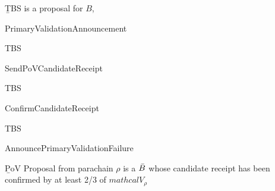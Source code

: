 \begin{definition}
  \label{defn-candidate-receipt}
        {\b TBS} is a proposal for $B$,
\end{definition}

\begin{algorithm}
  \caption[PrimaryValidationAnnouncement]{\sc PrimaryValidationAnnouncement}
  \label{algo-primary-validation-announcement}
  \begin{algorithmic}[1]
    \Require{}
    
    \State TBS
  \end{algorithmic}
\end{algorithm}

\begin{algorithm}
  \caption[]{\sc SendPoVCandidateReceipt}
  \label{algo-send-candidate-receipt}
  \begin{algorithmic}[1]
    \Require{}
    
    \State TBS
  \end{algorithmic}
\end{algorithm}

\begin{algorithm}
  \caption[]{\sc ConfirmCandidateReceipt}
  \label{algo-endorse-candidate-receipt}
  \begin{algorithmic}[1]
    \Require{}
    
    \State TBS
  \end{algorithmic}
\end{algorithm}

\begin{algorithm}
  \caption[]{\sc AnnouncePrimaryValidationFailure}
  \label{algo-announce-primary-validation-failure}
  \begin{algorithmic}[1]
    \Require{}
    
    \State
  \end{algorithmic}
\end{algorithm}


\begin{definition}
  \label{defn-pov-proposal}
        {\b PoV Proposal} from parachain $\rho$ is a $\bar{B}$ whose candidate receipt has been confirmed by at least 2/3 of $mathcal{V}_\rho$ 

\end{definition}

